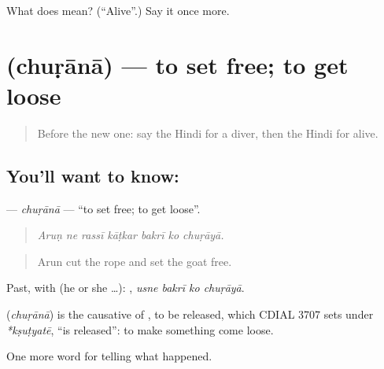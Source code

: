 \begin{tcolorbox}[breakable,colback=teal!4,colframe=teal!35!black,title={Before you move on}]
What does  mean? (\textquotedblleft{}Alive\textquotedblright{}.) Say it once more.
\end{tcolorbox}
\section[\texorpdfstring{\hi{छुड़ाना} (chuṛānā)}{छुड़ाना (chuṛānā)}]{ (chuṛānā) — to set free; to get loose}

\label{lesson:HI-C308-churana}



\begin{quote}
Before the new one: say the Hindi for a diver, then the Hindi for alive.
\end{quote}

\subsection*{You'll want to know: }
\textbf{} — \emph{chuṛānā} — \textquotedblleft{}to set free; to get loose\textquotedblright{}.

\begin{quote}
      
\end{quote}

\begin{quote}
\emph{Aruṇ ne rassī kāṭkar bakrī ko chuṛāyā.}
\end{quote}

\begin{quote}
Arun cut the rope and set the goat free.
\end{quote}

Past, with  (he or she …):    , \emph{usne bakrī ko chuṛāyā}.

\begin{cousinweb}
\textbf{} (\emph{chuṛānā}) is the causative of \textbf{}, to be released, which CDIAL 3707 sets under \emph{*kṣuṭyatē}, \textquotedblleft{}is released\textquotedblright{}: to make something come loose.
\end{cousinweb}

\begin{grammarlens}[title={What you've built}]
One more word for telling what happened.
\end{grammarlens}

